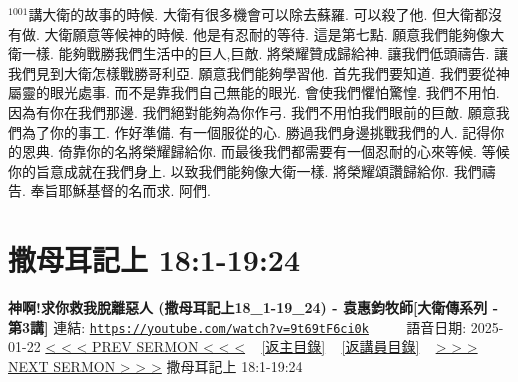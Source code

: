 \documentclass{book}
\begin{document}
$^{1001}$講大衛的故事的時候.
大衛有很多機會可以除去蘇羅.
可以殺了他.
但大衛都沒有做.
大衛願意等候神的時候.
他是有忍耐的等待.
這是第七點.
願意我們能夠像大衛一樣.
能夠戰勝我們生活中的巨人,巨敵.
將榮耀贊成歸給神.
讓我們低頭禱告.
讓我們見到大衛怎樣戰勝哥利亞.
願意我們能夠學習他.
首先我們要知道.
我們要從神屬靈的眼光處事.
而不是靠我們自己無能的眼光.
會使我們懼怕驚惶.
我們不用怕.
因為有你在我們那邊.
我們絕對能夠為你作弓.
我們不用怕我們眼前的巨敵.
願意我們為了你的事工.
作好準備.
有一個服從的心.
勝過我們身邊挑戰我們的人.
記得你的恩典.
倚靠你的名將榮耀歸給你.
而最後我們都需要有一個忍耐的心來等候.
等候你的旨意成就在我們身上.
以致我們能夠像大衛一樣.
將榮耀頌讚歸給你.
我們禱告.
奉旨耶穌基督的名而求.
阿們.
\newpage



\section{撒母耳記上 18:1-19:24}
\label{sec:9t69tF6ci0k}
\textbf{神啊!求你救我脫離惡人 (撒母耳記上18\_1-19\_24) - 袁惠鈞牧師[大衛傳系列 - 第3講]}
\newline
\newline
連結: \href{https://youtube.com/watch?v=9t69tF6ci0k}{\texttt{https://youtube.com/watch?v=9t69tF6ci0k}} ~~~~ 語音日期: 2025-01-22
\newline
\newline
\hyperref[sec:OtTM_EdQEtA]{< < < PREV SERMON < < <}
~
\hyperlink{toc}{[返主目錄]}
~
\hyperref[ch:preacher12]{[返講員目錄]}
~
\hyperref[sec:rN0dS2BBBmc]{> > > NEXT SERMON > > >}
\newline
\newline
撒母耳記上 18:1-19:24
\newline
\end{document}
